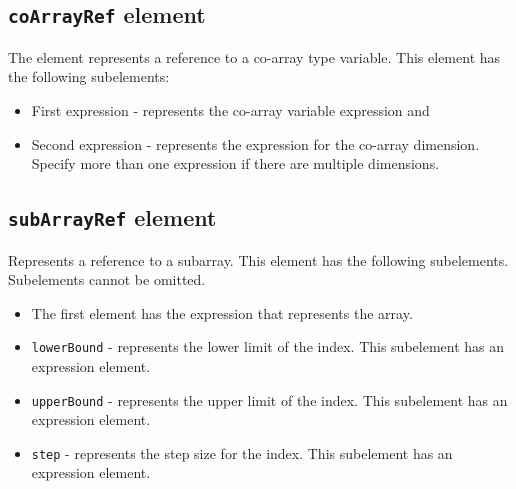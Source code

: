 \subsection{ {\tt coArrayRef} element}

The element represents a reference to a co-array type variable.
This element has the following subelements:

\begin{itemize}
\item First expression - represents the co-array variable expression and
\item Second expression - represents the expression for the co-array dimension. 
      Specify more than one expression if there are multiple dimensions. 
\end{itemize}


\subsection{ {\tt subArrayRef} element}

Represents a reference to a subarray. 
This element has the following subelements. Subelements cannot be omitted.

\begin{itemize}
\item The first element has the expression that represents the array.
\item {\tt lowerBound} - represents the lower limit of the index. 
      This subelement has an expression element.
\item {\tt upperBound} - represents the upper limit of the index.
      This subelement has an expression element.
\item {\tt step} - represents the step size for the index. 
      This subelement has an expression element.
\end{itemize}


